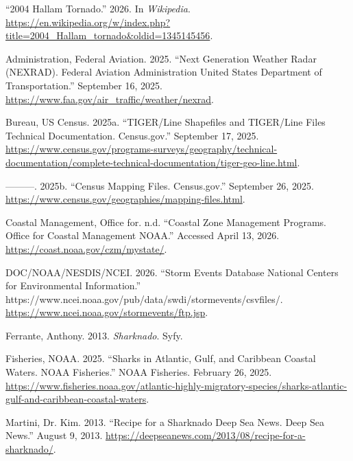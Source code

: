 \documentclass[
  letterpaper,
  DIV=11,
  numbers=noendperiod]{scrreprt}
\newlength{\cslhangindent}
\newenvironment{CSLReferences}[2] %
 {\begin{list}{}{%
  \setlength{\itemindent}{0pt}
  \setlength{\leftmargin}{0pt}
  \setlength{\parsep}{0pt}
  \ifodd #1
   \setlength{\leftmargin}{\cslhangindent}
   \setlength{\itemindent}{-1\cslhangindent}
  \fi
  \setlength{\itemsep}{#2\baselineskip}}}
 {\end{list}}
\begin{document}
\label{refs}
\begin{CSLReferences}{1}{0}
{``2004 Hallam Tornado.''} 2026. In \emph{Wikipedia}.
\url{https://en.wikipedia.org/w/index.php?title=2004_Hallam_tornado&oldid=1345145456}.

Administration, Federal Aviation. 2025. {``Next Generation Weather Radar
({NEXRAD}). Federal Aviation Administration {\textbar} United States
Department of Transportation.''} September 16, 2025.
\url{https://www.faa.gov/air_traffic/weather/nexrad}.

Bureau, US Census. 2025a. {``{TIGER}/Line Shapefiles and {TIGER}/Line
Files Technical Documentation. Census.gov.''} September 17, 2025.
\url{https://www.census.gov/programs-surveys/geography/technical-documentation/complete-technical-documentation/tiger-geo-line.html}.

---------. 2025b. {``Census Mapping Files. Census.gov.''} September 26,
2025. \url{https://www.census.gov/geographies/mapping-files.html}.

Coastal Management, Office for. n.d. {``Coastal Zone Management
Programs. Office for Coastal Management {\textbar} {NOAA}.''} Accessed
April 13, 2026. \url{https://coast.noaa.gov/czm/mystate/}.

DOC/NOAA/NESDIS/NCEI. 2026. {``Storm Events Database {\textbar} National
Centers for Environmental Information.''}
https://www.ncei.noaa.gov/pub/data/swdi/stormevents/csvfiles/.
\url{https://www.ncei.noaa.gov/stormevents/ftp.jsp}.

Ferrante, Anthony. 2013. \emph{Sharknado}. Syfy.

Fisheries, NOAA. 2025. {``Sharks in Atlantic, Gulf, and Caribbean
Coastal Waters. {NOAA} Fisheries.''} {NOAA} Fisheries. February 26,
2025.
\url{https://www.fisheries.noaa.gov/atlantic-highly-migratory-species/sharks-atlantic-gulf-and-caribbean-coastal-waters}.

Martini, Dr. Kim. 2013. {``Recipe for a Sharknado {\textbar} Deep Sea
News. Deep Sea News.''} August 9, 2013.
\url{https://deepseanews.com/2013/08/recipe-for-a-sharknado/}.


\end{CSLReferences}
\end{document}
